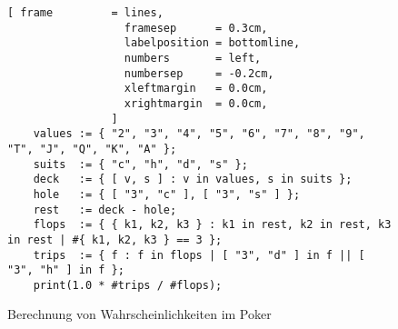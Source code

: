 \begin{figure}[!ht]
\centering
\begin{Verbatim}[ frame         = lines, 
                  framesep      = 0.3cm, 
                  labelposition = bottomline,
                  numbers       = left,
                  numbersep     = -0.2cm,
                  xleftmargin   = 0.0cm,
                  xrightmargin  = 0.0cm,
                ]
    values := { "2", "3", "4", "5", "6", "7", "8", "9", "T", "J", "Q", "K", "A" }; 
    suits  := { "c", "h", "d", "s" };
    deck   := { [ v, s ] : v in values, s in suits };
    hole   := { [ "3", "c" ], [ "3", "s" ] };
    rest   := deck - hole;
    flops  := { { k1, k2, k3 } : k1 in rest, k2 in rest, k3 in rest | #{ k1, k2, k3 } == 3 };
    trips  := { f : f in flops | [ "3", "d" ] in f || [ "3", "h" ] in f };
    print(1.0 * #trips / #flops);
\end{Verbatim}
\vspace*{-0.3cm}
\caption{Berechnung von Wahrscheinlichkeiten im Poker}
\label{fig:poker-triple.stlx}
\end{figure}

